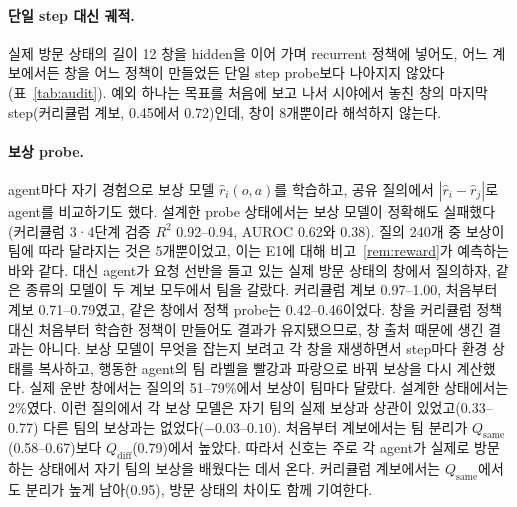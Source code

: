 \documentclass[twocolumn,10pt]{article}
\theoremstyle{remark}
\begin{document}
\paragraph{단일 step 대신 궤적.} 실제 방문 상태의 길이 12 창을 hidden을 이어 가며 recurrent 정책에 넣어도, 어느 계보에서든 창을
어느 정책이 만들었든 단일 step probe보다 나아지지 않았다(표~\ref{tab:audit}). 예외 하나는 목표를 처음에 보고 나서 시야에서 놓친
창의 마지막 step(커리큘럼 계보, 0.45에서 0.72)인데, 창이 8개뿐이라 해석하지 않는다.

\paragraph{보상 probe.} agent마다 자기 경험으로 보상 모델 $\hat r_i(o,a)$를 학습하고, 공유 질의에서 $|\hat r_i-\hat r_j|$로
agent를 비교하기도 했다. 설계한 probe 상태에서는 보상 모델이 정확해도 실패했다(커리큘럼 3·4단계 검증 $R^2$ 0.92--0.94, AUROC
0.62와 0.38). 질의 240개 중 보상이 팀에 따라 달라지는 것은 5개뿐이었고, 이는 E1에 대해 비고~\ref{rem:reward}가 예측하는 바와
같다. 대신 agent가 요청 선반을 들고 있는 실제 방문 상태의 창에서 질의하자, 같은 종류의 모델이 두 계보 모두에서 팀을 갈랐다.
커리큘럼 계보 0.97--1.00, 처음부터 계보 0.71--0.79였고, 같은 창에서 정책 probe는 0.42--0.46이었다. 창을 커리큘럼 정책 대신
처음부터 학습한 정책이 만들어도 결과가 유지됐으므로, 창 출처 때문에 생긴 결과는 아니다. 보상 모델이 무엇을 잡는지 보려고 각
창을 재생하면서 step마다 환경 상태를 복사하고, 행동한 agent의 팀 라벨을 빨강과 파랑으로 바꿔 보상을 다시 계산했다. 실제 운반
창에서는 질의의 51--79\%에서 보상이 팀마다 달랐다. 설계한 상태에서는 2\%였다. 이런 질의에서 각 보상 모델은 자기 팀의 실제
보상과 상관이 있었고(0.33--0.77) 다른 팀의 보상과는 없었다($-0.03$--$0.10$). 처음부터 계보에서는 팀 분리가 $Q_{\mathrm{same}}$
(0.58--0.67)보다 $Q_{\mathrm{diff}}$(0.79)에서 높았다. 따라서 신호는 주로 각 agent가 실제로 방문하는 상태에서 자기 팀의 보상을
배웠다는 데서 온다. 커리큘럼 계보에서는 $Q_{\mathrm{same}}$에서도 분리가 높게 남아(0.95), 방문 상태의 차이도 함께 기여한다.
\end{document}
